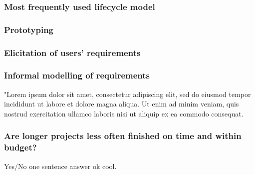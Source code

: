 \documentclass[letterpaper,12pt]{article}
\begin{document}
\subsubsection{Most frequently used lifecycle model}
\lipsum[66]
\subsubsection{Prototyping}
\lipsum[66]
\subsubsection{Elicitation of users' requirements}
\lipsum[75]
\subsubsection{Informal modelling of requirements}
"Lorem ipsum dolor sit amet, consectetur adipiscing elit, sed do eiusmod tempor incididunt ut labore et dolore magna aliqua. Ut enim ad minim veniam, quis nostrud exercitation ullamco laboris nisi ut aliquip ex ea commodo consequat.
\subsubsection{Are longer projects less often finished on time and within budget?}
Yes/No one sentence answer ok cool.
\end{document}
